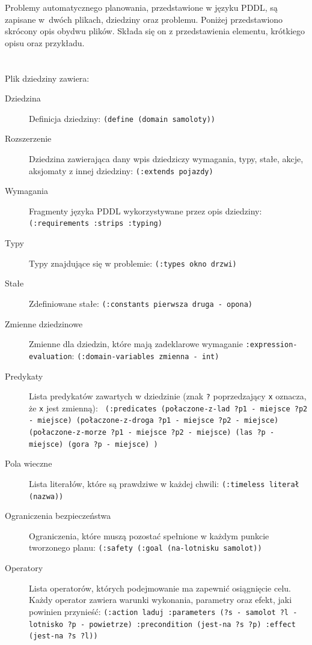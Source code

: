 Problemy automatycznego planowania, przedstawione w języku PDDL, są zapisane w~dwóch plikach, dziedziny oraz problemu. Poniżej przedstawiono skrócony opis obydwu plików. Składa się on z przedstawienia elementu, krótkiego opisu oraz przykładu.
\\\\\\
Plik dziedziny zawiera:
  \begin{description}
\item[Dziedzina] Definicja dziedziny: \texttt{(define (domain samoloty))}
\item[Rozszerzenie] Dziedzina zawierająca dany wpis dziedziczy wymagania, typy, stałe, akcje, aksjomaty z innej dziedziny: \texttt{(:extends pojazdy) }
\item[Wymagania] Fragmenty języka PDDL wykorzystywane przez opis dziedziny: \texttt{(:requirements :strips :typing)}
\item[Typy] Typy znajdujące się w problemie: \texttt{(:types okno drzwi)}
\item[Stałe] Zdefiniowane stałe: \texttt{(:constants pierwsza druga - opona)}
\item[Zmienne dziedzinowe] Zmienne dla dziedzin, które mają zadeklarowe wymaganie \texttt{:expression-evaluation}: \texttt{(:domain-variables zmienna - int)}
\item[Predykaty] Lista predykatów zawartych w dziedzinie (znak \texttt{?} poprzedzający \texttt{x} oznacza, że \texttt{x} jest zmienną):  \texttt{  (:predicates 
   (połaczone-z-lad ?p1 - miejsce ?p2 - miejsce) 
   (połaczone-z-droga ?p1 - miejsce ?p2 - miejsce) 
   (połaczone-z-morze ?p1 - miejsce ?p2 - miejsce) 
   (las ?p - miejsce) 
   (gora ?p - miejsce) )}
\item[Pola wieczne] Lista literałów, które są prawdziwe w każdej chwili: \texttt{(:timeless literał (nazwa))}
\item[Ograniczenia bezpieczeństwa] Ograniczenia, które muszą pozostać spełnione w każdym punkcie tworzonego planu: \texttt{(:safety (:goal (na-lotnisku samolot))}
\item[Operatory] Lista operatorów, których podejmowanie ma zapewnić osiągnięcie celu. Każdy operator zawiera warunki wykonania, parametry oraz efekt, jaki powinien przynieść: \texttt{(:action laduj :parameters (?s - samolot ?l - lotnisko ?p - powietrze) :precondition (jest-na ?s ?p) :effect (jest-na ?s ?l)) }\\
\end{description}


